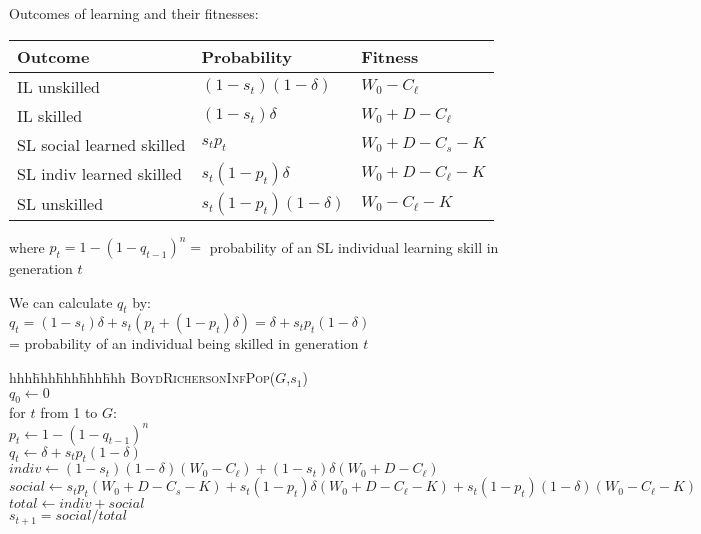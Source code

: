 \documentclass[11pt]{article}
\begin{document}
Outcomes of learning and their fitnesses:

\begin{tabular}{|l|l|l|}
\hline
Outcome & Probability & Fitness\\
\hline
IL unskilled & $ (1-s_t)(1-\delta) $ & $W_0 - C_\ell$\\
IL skilled & $ (1-s_t)\delta $ & $W_0 + D - C_\ell$\\
SL social learned skilled & $s_t p_t$ & $W_0 + D - C_s - K$\\
SL indiv learned skilled & $s_t (1-p_t)\delta$ & $W_0 + D - C_\ell - K$\\
SL unskilled & $s_t (1-p_t)(1-\delta)$ & $W_0 - C_\ell - K$\\
\hline
\end{tabular}

where
$p_t = 1-(1-q_{t-1})^n = $ probability of an SL individual learning skill in generation $t$

We can calculate $q_t$ by:\\
$q_t = (1-s_t)\delta + s_t( p_t + (1-p_t)\delta) = \delta + s_t p_t (1-\delta)$\\
\hspace{0.2in} = probability of an individual being skilled in generation $t$\\


\begin{tabbing}
hhh\=hhh\=hhh\=hhh\=hhh\kill
\textsc{ BoydRichersonInfPop}($G$,$s_1$)\\
\>$q_0 \leftarrow 0$\\
\>for $t$ from 1 to $G$:\\
\>\> $p_t \leftarrow 1-(1-q_{t-1})^n$\\ 
\>\> $q_t \leftarrow \delta + s_t p_t (1-\delta)$\\
\>\> $indiv \leftarrow (1-s_t)(1-\delta)(W_0-C_\ell) +(1-s_t)\delta (W_0 + D - C_\ell)$\\
\>\> $social \leftarrow s_t p_t (W_0 + D - C_s - K) +s_t (1-p_t)\delta (W_0 + D - C_\ell - K) 
      +s_t (1-p_t)(1-\delta)(W_0-C_\ell-K)$\\
\>\> $total \leftarrow indiv + social$ \\
\>\> $s_{t+1} = social/total$\\
\end{tabbing}
\end{document}
